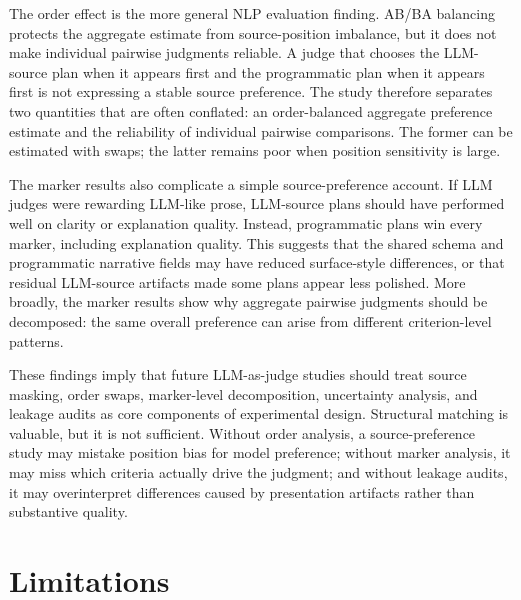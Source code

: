 \documentclass[11pt]{article}
\begin{document}
The order effect is the more general NLP evaluation finding. AB/BA balancing protects the aggregate estimate from source-position imbalance, but it does not make individual pairwise judgments reliable. A judge that chooses the LLM-source plan when it appears first and the programmatic plan when it appears first is not expressing a stable source preference. The study therefore separates two quantities that are often conflated: an order-balanced aggregate preference estimate and the reliability of individual pairwise comparisons. The former can be estimated with swaps; the latter remains poor when position sensitivity is large.

The marker results also complicate a simple source-preference account. If LLM judges were rewarding LLM-like prose, LLM-source plans should have performed well on clarity or explanation quality. Instead, programmatic plans win every marker, including explanation quality. This suggests that the shared schema and programmatic narrative fields may have reduced surface-style differences, or that residual LLM-source artifacts made some plans appear less polished. More broadly, the marker results show why aggregate pairwise judgments should be decomposed: the same overall preference can arise from different criterion-level patterns.

These findings imply that future LLM-as-judge studies should treat source masking, order swaps, marker-level decomposition, uncertainty analysis, and leakage audits as core components of experimental design. Structural matching is valuable, but it is not sufficient. Without order analysis, a source-preference study may mistake position bias for model preference; without marker analysis, it may miss which criteria actually drive the judgment; and without leakage audits, it may overinterpret differences caused by presentation artifacts rather than substantive quality.

\section*{Limitations}
\end{document}
